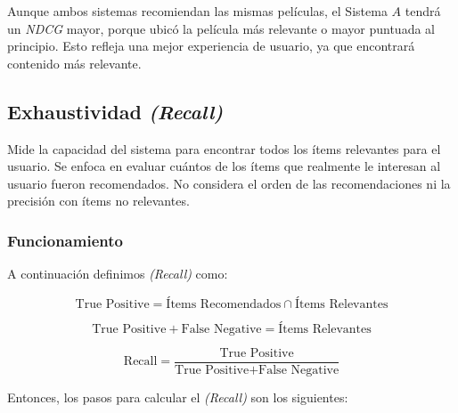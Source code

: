 \documentclass[11pt,a4paper,twoside]{thesis}
\begin{document}
Aunque ambos sistemas recomiendan las mismas películas, el Sistema $A$ tendrá un \textit{NDCG} mayor, porque ubicó la película más relevante o mayor puntuada al principio. Esto refleja una mejor experiencia de usuario, ya que encontrará contenido más relevante.

\subsection{Exhaustividad \textit{(Recall)}}

Mide la capacidad del sistema para encontrar todos los ítems relevantes para el usuario. Se enfoca en evaluar cuántos de los ítems que realmente le interesan al usuario fueron recomendados. No considera el orden de las recomendaciones ni la precisión con ítems no relevantes.

\subsubsection{Funcionamiento}

A continuación definimos \textit{(Recall)} como:

\begin{equation}
	\text{True Positive} = \text{Ítems Recomendados} \cap \text{Ítems Relevantes}
	\label{eq:tp}
\end{equation}

\begin{equation}
	\text{True Positive} + \text{False Negative} = \text{Ítems Relevantes}
	\label{eq:tp_fn}
\end{equation}

\begin{equation}
	\text{Recall} = \frac{\text{True Positive}}{\text{True Positive} + \text{False Negative}}
	\label{eq:recall}
\end{equation}

Entonces, los pasos para calcular el \textit{(Recall)} son los siguientes:
\end{document}
